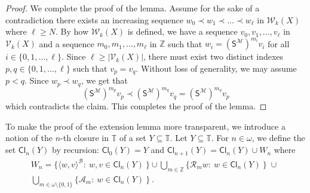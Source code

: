 \documentclass[10pt,a4paper, openany,  oldfontcommands]{memoir}
\newtheorem{open problem} [theorem] {Open Problem}
\newtheorem{open question} [theorem] {Open Question}
\renewcommand{\mathrm}{\mathsf}
\begin{document}
\begin{proof}
We complete the proof of the lemma. 
Assume for the sake of a contradiction there exists    an    increasing sequence 
 $  w_0  \prec  w_1  \prec     \ldots   \prec  w_{ \ell }   $   in   $  \mathcal{W}_k     \left(  X \right)     $
 where  $  \ell  \geq   N  $. 
 By how  $  \mathcal{W}_k     \left(  X \right)     $  is defined, 
 we have a sequence  $  v_0, v_1,   \ldots , v_{ \ell }     $  in   $  \mathcal{V}_k     \left(  X \right)     $
and a sequence  $  m_0, m_1,  \ldots , m_{ \ell }    $  in  $  \mathbb{Z} $  such that 
$  w_i =  \left(    \mathrm{S}^{  \mathcal{M} }  \right)^{  m_i }   v_i  $  for all $  i  \in  \lbrace 0, 1,  \ldots  ,  \ell \rbrace $.
Since  $  \ell   \geq      \vert     \mathcal{V}_k     \left(  X \right)   \vert  $,    there must  exist  two distinct  indexes  
$ p, q   \in      \lbrace 0, 1,  \ldots  ,  \ell \rbrace   $  such that  $  v_p   = v_q  $. 
Without loss of generality, we may assume  $  p <  q  $. 
Since  $  w_p  \prec  w_q  $,  we get that  
\[
   \left(    \mathrm{S}^{  \mathcal{M} }  \right)^{  m_p }   v_p    \prec     \left(    \mathrm{S}^{  \mathcal{M} }  \right)^{  m_q }   v_q    
   = 
      \left(    \mathrm{S}^{  \mathcal{M} }  \right)^{  m_q }   v_p
 \]  
 which contradicts the  claim. 
 This completes the proof of the lemma. 
\end{proof}














To make the proof of the extension lemma more transparent,  
we introduce a notion of    the $n$-th closure  in  $  \mathbb{T} $  of a set   $  Y  \subseteq  \mathbb{T}  $. 
Let   $  Y  \subseteq  \mathbb{T}  $. 
For  $  n  \in  \omega  $,  we define the set $  \mathsf{Cl}_n  \left(   Y  \right)   $  by recursion: 
$  \mathsf{Cl}_0  \left(   Y  \right)  =  Y    $  and  
$  \mathsf{Cl}_{n+1}   \left(   Y  \right)  =  \mathsf{Cl}_n  \left(   Y  \right)    \cup   W_n  $  where  
\begin{multline*}
W_n  =  
\big\{  \langle w,  v  \rangle^{  \mathcal{B}  }   :   \   w,  v   \in     \mathsf{Cl}_n  \left(   Y  \right)     \   \big\} 
\cup  
\bigcup_{  m  \in   \mathbb{Z}  }  
 \big\{    \mathcal{R}_m  w   :   \   w     \in  \mathsf{Cl}_n  \left(   Y  \right)     \   \big\} 
 \;   \cup   \;  
 \\
\bigcup_{  m  \in   \omega  \setminus  \lbrace 0, 1  \rbrace  }  
 \big\{    \mathcal{A}_m      :   \   w     \in   \mathsf{Cl}_n  \left(   Y  \right)     \   \big\} 
\          .
\end{multline*}
\end{document}
